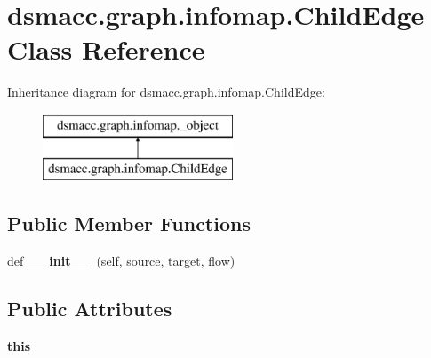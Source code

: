 \hypertarget{classdsmacc_1_1graph_1_1infomap_1_1ChildEdge}{}\section{dsmacc.\+graph.\+infomap.\+Child\+Edge Class Reference}
\label{classdsmacc_1_1graph_1_1infomap_1_1ChildEdge}
Inheritance diagram for dsmacc.\+graph.\+infomap.\+Child\+Edge\+:\begin{figure}[H]
\begin{center}
\leavevmode
\includegraphics[height=2.000000cm]{classdsmacc_1_1graph_1_1infomap_1_1ChildEdge}
\end{center}
\end{figure}
\subsection*{Public Member Functions}
\begin{DoxyCompactItemize}
\item 
\mbox{\label{classdsmacc_1_1graph_1_1infomap_1_1ChildEdge_afad57669e092e570d102d1a93ff1f8bc}} 
def {\bfseries \+\_\+\+\_\+init\+\_\+\+\_\+} (self, source, target, flow)
\end{DoxyCompactItemize}
\subsection*{Public Attributes}
\begin{DoxyCompactItemize}
\item 
\mbox{\label{classdsmacc_1_1graph_1_1infomap_1_1ChildEdge_a8b1d251d3972618771e7a753ce574fac}} 
{\bfseries this}
\end{DoxyCompactItemize}
